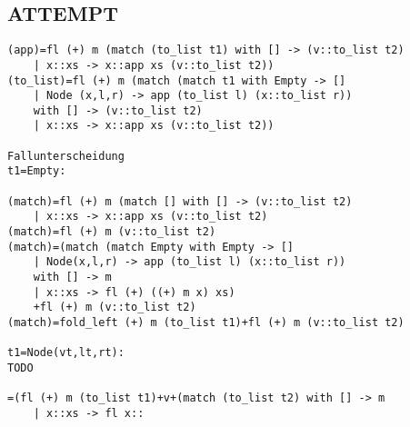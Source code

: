 \documentclass{article}
\begin{document}
\subsection*{ATTEMPT}

\begin{lstlisting}
(app)=fl (+) m (match (to_list t1) with [] -> (v::to_list t2)
	| x::xs -> x::app xs (v::to_list t2))
(to_list)=fl (+) m (match (match t1 with Empty -> []
	| Node (x,l,r) -> app (to_list l) (x::to_list r))
	with [] -> (v::to_list t2)
	| x::xs -> x::app xs (v::to_list t2))

Fallunterscheidung
t1=Empty:

(match)=fl (+) m (match [] with [] -> (v::to_list t2)
	| x::xs -> x::app xs (v::to_list t2)
(match)=fl (+) m (v::to_list t2)
(match)=(match (match Empty with Empty -> []
	| Node(x,l,r) -> app (to_list l) (x::to_list r))
	with [] -> m
	| x::xs -> fl (+) ((+) m x) xs)
	+fl (+) m (v::to_list t2)
(match)=fold_left (+) m (to_list t1)+fl (+) m (v::to_list t2)

t1=Node(vt,lt,rt):
TODO

=(fl (+) m (to_list t1)+v+(match (to_list t2) with [] -> m
	| x::xs -> fl x::
\end{lstlisting}
\end{document}
